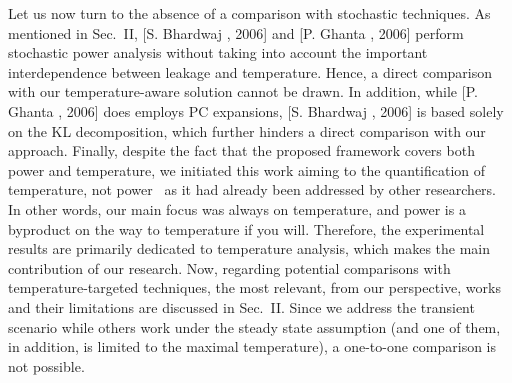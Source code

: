 \begin{authors}
Let us now turn to the absence of a comparison with stochastic techniques.
As mentioned in Sec.~II, [S. Bhardwaj \etal, 2006] and [P. Ghanta \etal, 2006] perform stochastic power analysis without taking into account the important interdependence between leakage and temperature.
Hence, a direct comparison with our temperature-aware solution cannot be drawn.
In addition, while [P. Ghanta \etal, 2006] does employs PC expansions, [S. Bhardwaj \etal, 2006] is based solely on the KL decomposition, which further hinders a direct comparison with our approach.
Finally, despite the fact that the proposed framework covers both power and temperature, we initiated this work aiming to the quantification of temperature, not power \perse\ as it had already been addressed by other researchers.
In other words, our main focus was always on temperature, and power is a byproduct on the way to temperature if you will.
Therefore, the experimental results are primarily dedicated to temperature analysis, which makes the main contribution of our research.
Now, regarding potential comparisons with temperature-targeted techniques, the most relevant, from our perspective, works and their limitations are discussed in Sec.~II.
Since we address the transient scenario while others work under the steady state assumption (and one of them, in addition, is limited to the maximal temperature), a one-to-one comparison is not possible.

\end{authors}
